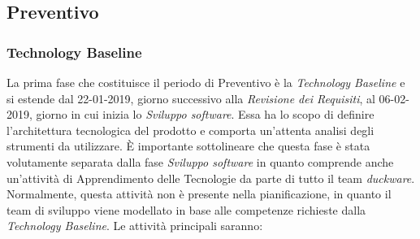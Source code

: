 \clearpage
\subsection{Preventivo}
\label{sec:preventivo}

\subsubsection{Technology Baseline}
\label{sec:technology_baseline}
La prima fase che costituisce il periodo di Preventivo è la \emph{Technology Baseline} e si estende dal 22-01-2019, giorno successivo alla \emph{Revisione dei Requisiti}, al 06-02-2019, giorno in cui inizia lo \emph{Sviluppo software}. Essa ha lo scopo di definire l'architettura tecnologica del prodotto e comporta un'attenta analisi degli strumenti da utilizzare. 
\`E importante sottolineare che questa fase è stata volutamente separata dalla fase \emph{Sviluppo software} in quanto comprende anche un'attività di Apprendimento delle Tecnologie da parte di tutto il team \emph{duckware}. Normalmente, questa attività non è presente nella pianificazione, in quanto il team di sviluppo viene modellato in base alle competenze richieste dalla \emph{Technology Baseline}.
Le attività principali saranno:
